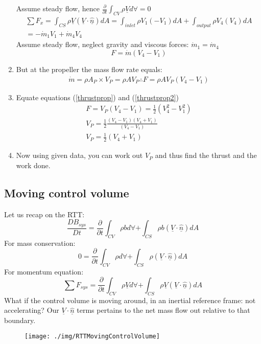 \begin{enumerate}[noitemsep]
\begin{equation}
        \end{equation}
        Assume steady flow, hence $\frac{\partial}{\partial t} \int_{CV} \rho \underline{V} d \forall =0$
        \begin{gather}
          \sum F_x = \int_{CS} \rho \underline{V} (\underline{V} \cdot \underline{\hat{n}}) dA = \int_{inlet} \rho V_1 (-V_1) dA + \int_{output} \rho V_4 (V_4) dA\\
          = -\dot{m}_1 V_1 + \dot{m}_4 V_4
        \end{gather}
        Assume steady flow, neglect gravity and viscous forces: $\dot{m}_1 = \dot{m}_4$
        \begin{equation}
          F = \dot{m}(V_4 - V_1)
        \end{equation}
  \item But at the propeller the mass flow rate equals:
        \begin{gather}
          \dot{m} = \rho A_P \times V_P = \rho A V_P
          \therefore F = \rho A V_P (V_4 - V_1) \label{thrustprop2}
        \end{gather}
  \item Equate equations (\ref{thrustprop}) and (\ref{thrustprop2})
        \begin{gather}
          F = V_P (V_4 - V_1) = \frac{1}{2}(V_4^2 - V_1^2)\\
          V_P = \frac{1}{2}\frac{(V_4 - V_1)(V_4 + V_1 )}{(V_4 - V_1)}\\
          V_P = \frac{1}{2}(V_4 + V_1 )
        \end{gather}
  \item Now using given data, you can work out $V_P$ and thus find the thrust and the work done.
\end{enumerate}
\subsection{Moving control volume}
Let us recap on the RTT:
\begin{equation}
  \frac{DB_{sys}}{Dt} = \frac{\partial}{\partial t} \int_{CV} \rho b d \forall + \int_{CS} \rho b (\underline{V}\cdot \underline{\hat{n}}) dA
\end{equation}
For mass conservation:
\begin{equation}
  0 = \frac{\partial}{\partial t} \int_{CV} \rho d \forall + \int_{CS} \rho (\underline{V}\cdot \underline{\hat{n}}) dA
\end{equation}
For momentum equation:
\begin{equation}
  \sum F_{sys} = \frac{\partial}{\partial t} \int_{CV} \rho \underline{V} d \forall + \int_{CS} \rho \underline{V} (\underline{V}\cdot \underline{\hat{n}}) dA
\end{equation}
What if the control volume is moving around, in an inertial reference frame: not accelerating? Our $\underline{V} \cdot \underline{\hat{n}}$ terms pertains to the net mass flow out relative to that boundary.
\begin{figure}
  \centering
  \texttt{[image: ./img/RTTMovingControlVolume]}
\end{figure}
